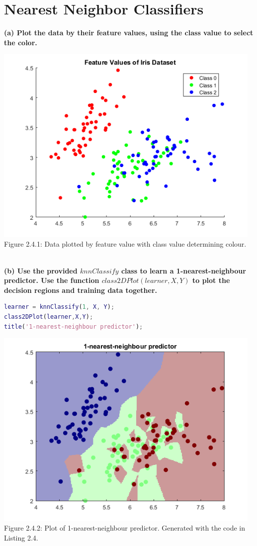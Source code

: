 \documentclass[]{report}   %
\begin{document}
\section{Nearest Neighbor Classifiers}
{\bf (a) Plot the data by their feature values, using the class value to select the color.}
\begin{center}
	\includegraphics[width=35em]{2_4_Figure_1.png}
	{Figure 2.4.1: Data plotted by feature value with class value determining colour.}
\end{center} 
~\\
{\bf (b) Use the provided $knnClassify$ class to learn a 1-nearest-neighbour predictor. Use the function $class2DPlot(learner,X,Y)$ to plot the decision regions and training data together.}
\begin{lstlisting}[language=Matlab, caption=Teaching the 1-nearest-neighbour predictor.]
learner = knnClassify(1, X, Y);
class2DPlot(learner,X,Y);
title('1-nearest-neighbour predictor');
\end{lstlisting}
\begin{center}
	\includegraphics[width=35em]{2_4_Figure_2.png}
	{Figure 2.4.2: Plot of 1-nearest-neighbour predictor. Generated with the code in Listing 2.4.}
\end{center} 
\end{document}
